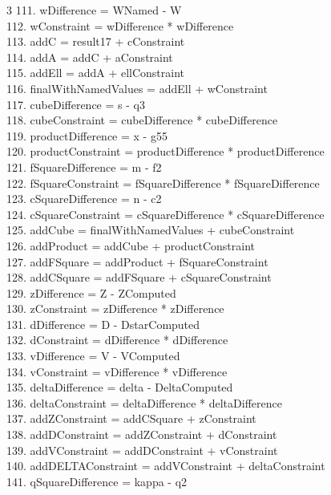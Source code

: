 \documentclass[10pt]{article}
\begin{document}
\begin{multicols}{3}
111. wDifference = WNamed - W\\
112. wConstraint = wDifference * wDifference\\
113. addC = result17 + cConstraint\\
114. addA = addC + aConstraint\\
115. addEll = addA + ellConstraint\\
116. finalWithNamedValues = addEll + wConstraint\\
117. cubeDifference = s - q3\\
118. cubeConstraint = cubeDifference * cubeDifference\\
119. productDifference = x - g55\\
120. productConstraint = productDifference * productDifference\\
121. fSquareDifference = m - f2\\
122. fSquareConstraint = fSquareDifference * fSquareDifference\\
123. cSquareDifference = n - c2\\
124. cSquareConstraint = cSquareDifference * cSquareDifference\\
125. addCube = finalWithNamedValues + cubeConstraint\\
126. addProduct = addCube + productConstraint\\
127. addFSquare = addProduct + fSquareConstraint\\
128. addCSquare = addFSquare + cSquareConstraint\\
129. zDifference = Z - ZComputed\\
130. zConstraint = zDifference * zDifference\\
131. dDifference = D - DstarComputed\\
132. dConstraint = dDifference * dDifference\\
133. vDifference = V - VComputed\\
134. vConstraint = vDifference * vDifference\\
135. deltaDifference = delta - DeltaComputed\\
136. deltaConstraint = deltaDifference * deltaDifference\\
137. addZConstraint = addCSquare + zConstraint\\
138. addDConstraint = addZConstraint + dConstraint\\
139. addVConstraint = addDConstraint + vConstraint\\
140. addDELTAConstraint = addVConstraint + deltaConstraint\\
141. qSquareDifference = kappa - q2\\

\end{multicols}
\end{document}

